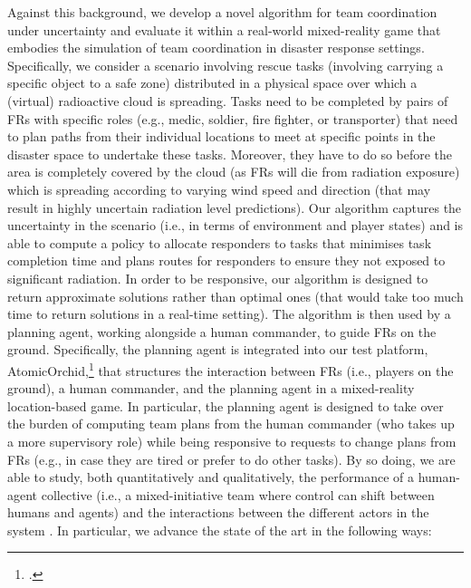 Against this background, we develop a novel algorithm for team coordination under uncertainty and evaluate it within a real-world mixed-reality game that embodies the simulation of team coordination in disaster response settings. Specifically, we consider a scenario involving rescue tasks (involving carrying a specific object to a safe zone) distributed in a physical space over which a (virtual) radioactive cloud is spreading.  Tasks need to be completed by pairs of FRs with specific roles (e.g., medic, soldier, fire fighter, or transporter) that need to plan paths from their individual locations to meet at specific points in the disaster space to undertake these tasks. Moreover, they have to do so before the area is completely covered by the cloud (as FRs will die from radiation exposure) which is spreading according to varying wind speed and direction (that may result in highly uncertain radiation level predictions). Our algorithm captures the uncertainty in the scenario (i.e., in terms of environment and player states) and  is able to compute a policy to allocate responders to tasks that minimises task completion time and plans routes for responders to ensure they not exposed to significant radiation. In order to be responsive, our algorithm is designed to return approximate solutions rather than optimal ones (that would take too much time to return solutions in a real-time setting).  The algorithm is then used by a planning agent, working alongside a human commander, to guide FRs  on the ground. Specifically, the planning agent is integrated  into our test platform, AtomicOrchid,\footnote{.} that structures the interaction between FRs (i.e., players on the ground), a human commander, and the planning agent in a mixed-reality location-based game. In particular, the planning agent is designed to take over the burden of computing team plans from the human commander (who takes up a more supervisory role) while being responsive to  requests to change plans from FRs (e.g., in case they are tired or prefer to do other tasks). By so doing, we are able to study, both quantitatively and qualitatively, the performance of a human-agent collective (i.e., a mixed-initiative team where control can shift between humans and agents)  and the interactions between the different actors in the system  \cite{jennings:etal:2014}. In particular, we  advance the state of the art in the following ways:
